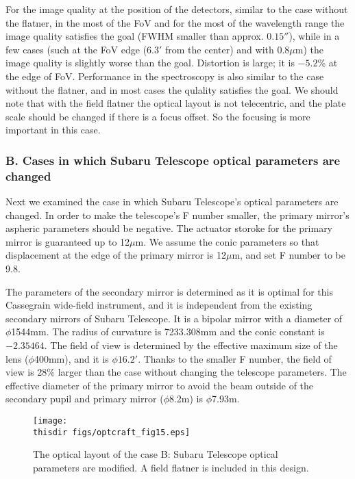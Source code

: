 For the image quality at the position of the detectors, similar to the
case without the flatner, in the most of the FoV and for the most of the
wavelength range the image quality satisfies the goal (FWHM smaller than
approx. $0.15''$), while in a few cases (such at the FoV edge ($6.3'$
from the center) and with 0.8$\mu$m) the image quality is slightly worse
than the goal. Distortion is large; it is $-5.2$\% at the edge of FoV.
Performance in the spectroscopy is also similar to the case without the
flatner, and in most cases the qulality satisfies the goal.
We should note that with the field flatner the optical layout is not
telecentric, and the plate scale should be changed if there is a focus
offset.  So the focusing is more important in this case.




\subsubsection{B. Cases in which Subaru Telescope optical parameters are
   changed}

Next we examined the case in which Subaru Telescope's optical parameters
are changed. In order to make the telescope's F number smaller, the
primary mirror's aspheric parameters should be negative. The actuator
storoke for the primary mirror is guaranteed up to 12$\mu$m. We assume
the conic parameters so that displacement at the edge of the primary
mirror is 12$\mu$m, and set F number to be 9.8.

The parameters of the secondary mirror is determined as it is optimal
for this Cassegrain wide-field instrument, and it is independent from
the existing secondary mirrors of Subaru Telescope.
It is a bipolar mirror with a diameter of $\phi$1544mm. The radius of
curvature is 7233.308mm and the conic constant is $-2.35464$.
The field of view is determined by the effective maximum size of the
lens ($\phi$400mm), and it is $\phi16.2'$.
Thanks to the smaller F number, the field of view is 28\% larger than
the case without changing the telescope parameters. The effective
diameter of the primary mirror to avoid the beam outside of the
secondary pupil and primary mirror ($\phi$8.2m) is $\phi$7.93m.

\begin{figure}[!ht]
\centerline{
\texttt{[image: \\thisdir figs/optcraft\_fig15.eps]}
}
\caption{The optical layout of the case B: Subaru Telescope
 optical parameters are modified. A field flatner is included in this
 design. 
}
\label{fig:optcraft_fig15}
\end{figure}


